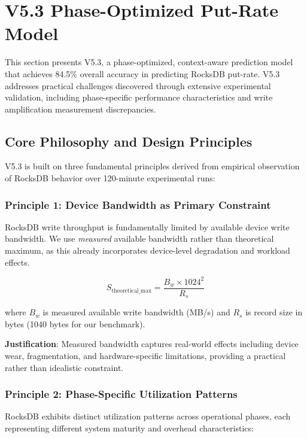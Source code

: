 \section{V5.3 Phase-Optimized Put-Rate Model}
\label{sec:dynamic_model}

This section presents V5.3, a phase-optimized, context-aware prediction model that achieves 84.5\% overall accuracy in predicting RocksDB put-rate. V5.3 addresses practical challenges discovered through extensive experimental validation, including phase-specific performance characteristics and write amplification measurement discrepancies.

\subsection{Core Philosophy and Design Principles}

V5.3 is built on three fundamental principles derived from empirical observation of RocksDB behavior over 120-minute experimental runs:

\subsubsection{Principle 1: Device Bandwidth as Primary Constraint}

RocksDB write throughput is fundamentally limited by available device write bandwidth. We use \textit{measured} available bandwidth rather than theoretical maximum, as this already incorporates device-level degradation and workload effects.

\begin{equation}
S_{\text{theoretical\_max}} = \frac{B_w \times 1024^2}{R_s}
\label{eq:theoretical_max}
\end{equation}

where $B_w$ is measured available write bandwidth (MB/s) and $R_s$ is record size in bytes (1040 bytes for our benchmark).

\textbf{Justification}: Measured bandwidth captures real-world effects including device wear, fragmentation, and hardware-specific limitations, providing a practical rather than idealistic constraint.

\subsubsection{Principle 2: Phase-Specific Utilization Patterns}

RocksDB exhibits distinct utilization patterns across operational phases, each representing different system maturity and overhead characteristics:

